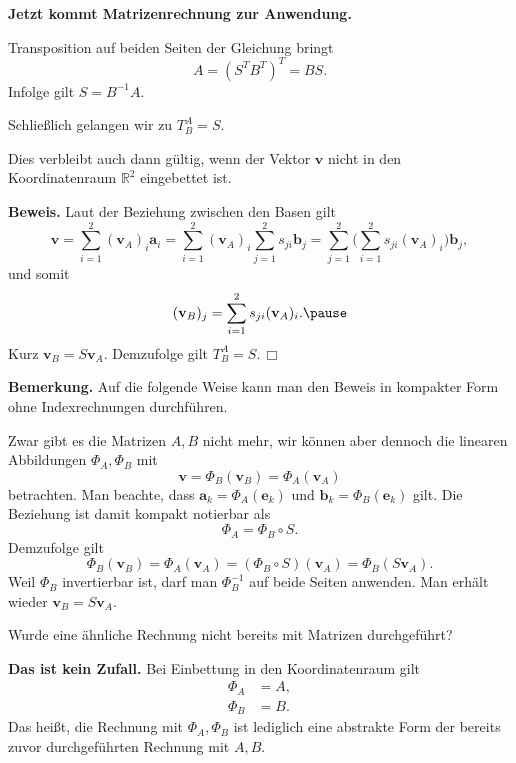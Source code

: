 \documentclass[9pt]{beamer}
\newcommand{\bv}[1]{\mathbf{#1}}
\newcommand{\R}{\mathbb R}
\newcommand{\strong}[1]{\textsf{\textbf{#1}}}
\renewcommand{\qedsymbol}{\ensuremath{\Box}}
\newcommand{\basis}[1]{#1}
\begin{document}
\begin{frame}
\strong{Jetzt kommt Matrizenrechnung zur Anwendung.}\pause

\vspace{1em}
Transposition auf beiden Seiten der Gleichung bringt
\[A = (S^T B^T)^T = BS.\]\pause
Infolge gilt $S = B^{-1}A$.\pause

\vspace{1em}
Schließlich gelangen wir zu $T_{\basis B}^{\basis A}=S$.
\end{frame}

\begin{frame}
Dies verbleibt auch dann gültig, wenn der Vektor $\bv v$
nicht in den Koordinatenraum $\R^2$ eingebettet ist.\pause

\vspace{1em}
\strong{Beweis.} Laut der Beziehung zwischen den Basen gilt
\[\bv v = \sum_{i=1}^2 (\bv v_{\basis A})_i\bv a_i
= \sum_{i=1}^2 (\bv v_{\basis A})_i\sum_{j=1}^2 s_{ji}\bv b_j
= \sum_{j=1}^2\bigg(\sum_{i=1}^2 s_{ji}(\bv v_{\basis A})_i\bigg)\bv b_j,\]
und somit
\[(\bv v_{\basis B})_j = \sum_{i=1}^2 s_{ji}(\bv v_A)_i.\pause\]
Kurz $\bv v_{\basis B} = S\bv v_{\basis A}$.
Demzufolge gilt $T_{\basis B}^{\basis A} = S$.\,\qedsymbol
\end{frame}

\begin{frame}
\strong{Bemerkung.}
Auf die folgende Weise kann man den Beweis in kompakter Form ohne
Indexrechnungen durchführen.\pause

\vspace{1em}
Zwar gibt es die Matrizen $A,B$ nicht mehr, wir können aber dennoch
die linearen Abbildungen $\Phi_{\basis A},\Phi_{\basis B}$ mit
\[\bv v = \Phi_{\basis B}(\bv v_{\basis B}) = \Phi_{\basis A}(\bv v_{\basis A})\]
betrachten. Man beachte, dass $\bv a_k = \Phi_{\basis A}(\bv e_k)$
und $\bv b_k = \Phi_{\basis B}(\bv e_k)$ gilt. Die Beziehung ist damit
kompakt notierbar als
\[\Phi_{\basis A} = \Phi_{\basis B}\circ S.\]\pause
Demzufolge gilt
\[\Phi_{\basis B}(\bv v_{\basis B}) = \Phi_{\basis A}(\bv v_{\basis A})
= (\Phi_{\basis B}\circ S)(\bv v_{\basis A}) = \Phi_{\basis B}(S\bv v_{\basis A}).\]
Weil $\Phi_{\basis B}$ invertierbar ist, darf man $\Phi_{\basis B}^{-1}$ auf beide
Seiten anwenden. Man erhält wieder $\bv v_{\basis B} = S\bv v_{\basis A}$.
\end{frame}

\begin{frame}
Wurde eine ähnliche Rechnung nicht bereits mit Matrizen
durchgeführt?\pause

\vspace{1em}
\strong{Das ist kein Zufall.} Bei Einbettung in den
Koordinatenraum gilt
\begin{align*}
\Phi_{\basis A} &= A,\\
\Phi_{\basis B} &= B.
\end{align*}
Das heißt, die Rechnung mit $\Phi_{\basis A},\Phi_{\basis B}$ ist lediglich
eine abstrakte Form der bereits zuvor durchgeführten Rechnung mit $A,B$.
\end{frame}
\end{document}
